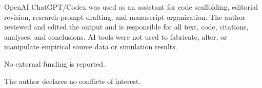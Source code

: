 
OpenAI ChatGPT/Codex was used as an assistant for code scaffolding, editorial revision, research-prompt drafting, and manuscript organization. The author reviewed and edited the output and is responsible for all text, code, citations, analyses, and conclusions. AI tools were not used to fabricate, alter, or manipulate empirical source data or simulation results.


No external funding is reported.


The author declares no conflicts of interest.
